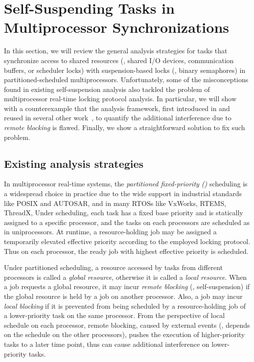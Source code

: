 \section{Self-Suspending Tasks in Multiprocessor Synchronizations}
\label{sec:syn}

In this section, we will review the general analysis strategies for tasks that synchronize access to shared resources (\eg, shared I/O devices, communication buffers, or scheduler locks) with suspension-based locks (\eg, binary semaphores) in partitioned-scheduled multiprocessors. Unfortunately, some of the misconceptions found in existing self-suspension analysis also tackled the problem of multiprocessor real-time locking protocol analysis. In particular, we will show with a counterexample that the analysis framework, first introduced in \cite{lakshmanan-2009} and reused in several other work~\cite{zeng-2011,bbb-2013,yang-2013,kim-2014,han-2014,carminati-2014,yang-2014}, to quantify the additional interference due to \emph{remote blocking} is flawed. Finally, we show a straightforward solution to fix such problem. 

\subsection{Existing analysis strategies}
\label{sec:papers}

In multiprocessor real-time systems, the \emph{partitioned fixed-priority (\pfp)} scheduling is a widespread choice in practice due to the wide support in industrial standards like POSIX and AUTOSAR, and in many RTOSs like VxWorks, RTEMS, ThreadX, \etc Under \pfp scheduling, each task has a fixed base priority and is statically assigned to a specific processor, and the tasks on each processors are scheduled as in uniprocessors. At runtime, a resource-holding job may be assigned a temporarily elevated effective priority according to the employed locking protocol. Thus on each processor, the ready job with highest effective priority is scheduled. 

Under partitioned scheduling, a resource accessed by tasks from different processors is called a \emph{global resource}, otherwise it is called a \emph{local resource}. When a job requests a global resource, it may incur \emph{remote blocking} (\ie, self-suspension) if the global resource is held by a job on another processor. Also, a job may incur \emph{local blocking} if it is prevented from being scheduled by a resource-holding job of a lower-priority task on the same processor. From the perspective of local schedule on each processor, remote blocking, caused by external events (\ie, depends on the schedule on the other processors), pushes the execution of higher-priority tasks to a later time point, thus can cause additional interference on lower-priority tasks. 

